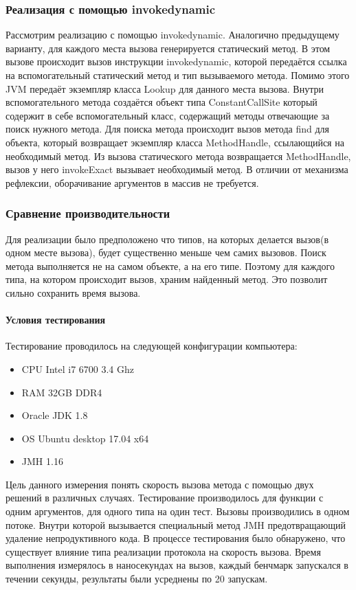 \subsubsection{Реализация с помощью invokedynamic}
Рассмотрим реализацию с помощью invokedynamic. Аналогично предыдущему варианту, для каждого места вызова генерируется статический метод. В этом вызове происходит вызов инструкции invokedynamic, которой передаётся ссылка на вспомогательный статический метод и тип вызываемого метода. Помимо этого JVM передаёт экземпляр класса Lookup для данного места вызова. Внутри вспомогательного метода создаётся объект типа ConstantCallSite который содержит в себе вспомогательный класс, содержащий методы отвечающие за поиск нужного метода. Для поиска метода происходит вызов метода find для объекта, который возвращает экземпляр класса MethodHandle, ссылающийся на необходимый метод. Из вызова статического метода возвращается MethodHandle, вызов у него invokeExact вызывает необходимый метод. В отличии от механизма рефлексии, оборачивание аргументов в массив не требуется.

\subsubsection{Сравнение производительности}
Для реализации было предположено что типов, на которых делается вызов(в одном месте вызова), будет существенно меньше чем самих вызовов. Поиск метода выполняется не на самом объекте, а на его типе. Поэтому для каждого типа, на котором происходит вызов, храним найденный метод. Это позволит сильно сохранить время вызова.

\paragraph{Условия тестирования}
Тестирование проводилось на следующей конфигурации компьютера:
\begin{itemize}
    \item CPU Intel i7 6700 3.4 Ghz
    \item RAM 32GB DDR4
    \item Oracle JDK 1.8
    \item OS Ubuntu desktop 17.04 x64
    \item JMH 1.16
\end{itemize}

Цель данного измерения понять скорость вызова метода с помощью двух решений в различных случаях. Тестирование производилось для функции с одним аргументов, для одного типа на один тест. Вызовы производились в одном потоке. Внутри которой вызывается специальный метод JMH предотвращающий удаление непродуктивного кода. В процессе тестирования было обнаружено, что существует влияние типа реализации протокола на скорость вызова. Время выполнения измерялось в наносекундах на вызов, каждый бенчмарк запускался в течении секунды, результаты были усреднены по 20 запускам.

